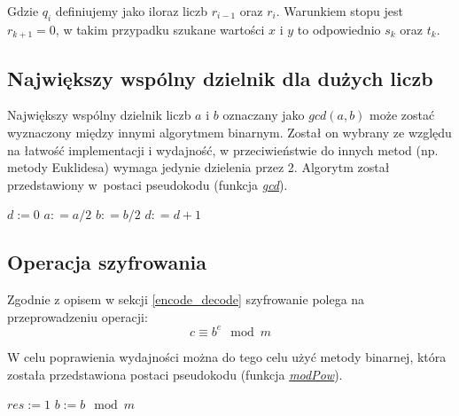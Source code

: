 \documentclass[10pt,a4paper]{article}
\begin{document}
Gdzie $q_i$ definiujemy jako iloraz liczb $r_{i-1}$ oraz $r_i$. Warunkiem stopu jest $r_{k+1} = 0$, w takim przypadku szukane wartości $x$ i $y$ to odpowiednio $s_k$ oraz $t_k$. 
 
\subsection{Największy wspólny dzielnik dla dużych liczb}
Największy wspólny dzielnik liczb $a$ i $b$ oznaczany jako $gcd(a,b)$ może zostać wyznaczony między innymi algorytmem binarnym. Został on wybrany ze względu na łatwość implementacji i wydajność, w przeciwieństwie do innych metod (np. metody Euklidesa) wymaga jedynie dzielenia przez 2. Algorytm został przedstawiony w~postaci pseudokodu (funkcja \hyperref[fun_gcd]{\textit{gcd}}).

\begin{algorithm} \label{fun_gcd}
\begin{algorithmic}[1]
\State $d := 0$
	\State $a : =a/2$
	\State $b : =b/2$
	\State $d : = d + 1$
\EndWhile

	   
	   
	  
	 \Else {}
	 \EndIf
\EndWhile

\State {}
\EndFunction
\end{algorithmic}
\end{algorithm}


\subsection{Operacja szyfrowania}

Zgodnie z opisem w sekcji \ref{encode_decode} szyfrowanie polega na przeprowadzeniu operacji:
\begin{equation}
c \equiv b^e \mod m
\end{equation}

W celu poprawienia wydajności można do tego celu użyć metody binarnej, która została przedstawiona postaci pseudokodu (funkcja \hyperref[fun_modPow]{\textit{modPow}}).


\begin{algorithm} \label{fun_modPow}
\begin{algorithmic}[1]
\EndIf

\State $res := 1$
\State $b := b \mod m$
	\EndIf
\EndWhile

\State {}
\EndFunction
\end{algorithmic}
\end{algorithm}
\end{document}
